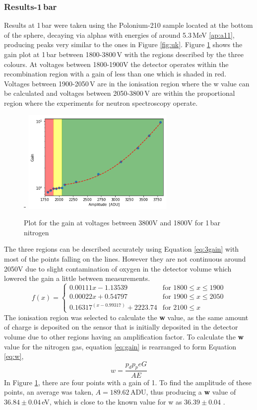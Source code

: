 \documentclass[a4paper]{article}
\begin{document}
\subsubsection{Results-1\,bar}
Results at 1\,bar were taken using the Polonium-210 sample located at the bottom of the sphere, decaying via alphas with energies of around 5.3\,MeV \ref{ap:a11}, producing peaks very similar to the ones in Figure \ref{fig:uk}. Figure \ref{fig:gain2} shows the gain plot at 1\,bar between 1800-3800\,V with the regions described by the three colours. At voltages between 1800-1900V the detector operates within the recombination region with a gain of less than one which is shaded in red. Voltages between 1900-2050\,V are in the ionisation region where the w value can be calculated and voltages between 2050-3800\,V are within the proportional region where the experiments for neutron spectroscopy operate.
\begin{figure}[H]-
    \centering
    \includegraphics[height=5cm]{1bargainfit.png}
    \caption{Plot for the gain at voltages between 3800V and 1800V for 1\,bar nitrogen}
    \label{fig:gain2}
\end{figure}
\noindent The three regions can be described accurately using Equation \ref{eq:3gain} with most of the points falling on the lines. However they are not continuous around 2050V due to slight contamination of oxygen in the detector volume which lowered the gain a little between measurements.
\begin{equation}
f(x) = \begin{cases} 0.00111x-1.13539 &\mbox{for } 1800 \leq x  \leq 1900 \\
0.00022x+0.54797 & \mbox{for } 1900\leq x \leq 2050 \\
0.16317^{(x-0.99317)}+2223.74 & \mbox{for }  2100 \leq x
\end{cases}
\label{eq:3gain}
\end{equation}
 The ionisation region was selected to calculate the \textbf{w} value, as the same amount of charge is deposited on the sensor that is initially deposited in the detector volume due to other regions having an amplification factor. To calculate the \textbf{w} value for the nitrogen gas, equation \ref{eq:gain} is rearranged to form Equation \ref{eq:w},
\begin{equation}
    w = \frac{p_dp_peG}{AE}
    \label{eq:w}
\end{equation}
\noindent In Figure \ref{fig:gain2}, there are four points with a gain of 1. To find the amplitude of these points, an average was taken, $A=189.62$\,ADU, thus producing a \textbf{w} value of $36.84 \pm 0.04$\,eV, which is close to the known value for w as $36.39 \pm 0.04$ \cite{Krieger_1979}. 
\end{document}
